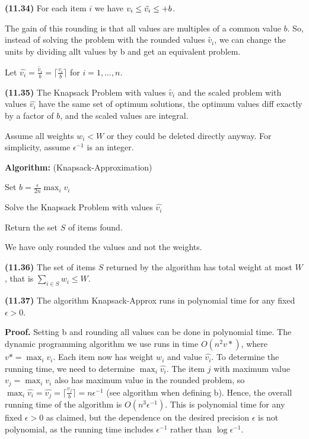 \documentclass{proc}
\begin{document}
\begin{mdframed}
    \textbf{(11.34)} For each item $i$ we have $v_i \le \tilde{v_i} \le \title{v_i} + b$.
\end{mdframed}

The gain of this rounding is that all values are multiples of a common value $b$. So, instead of solving the problem with the rounded values $\tilde{v_i}$, we can change the units by dividing allt values by b and get an equivalent problem.

\begin{mdframed}
    Let $\hat{v_i} = \frac{\tilde{v_i}}{b} = \lceil \frac{v_i}{b} \rceil$ for $i = 1, \ldots, n$.
\end{mdframed}

\begin{mdframed}
    \textbf{(11.35)} The Knapsack Problem with values $\tilde{v_i}$ and the scaled problem with values $\hat{v_i}$ have the same set of optimum solutions, the optimum values diff exactly by a factor of $b$, and the scaled values are integral.
\end{mdframed}

Assume all weights $w_i < W$ or they could be deleted directly anyway. For simplicity, assume $\epsilon^{-1}$ is an integer.

\begin{mdframed}
    \textbf{Algorithm:} (Knapsack-Approximation)

    Set $b = \frac{\epsilon}{2n} \max_i v_i$
    
    Solve the Knapsack Problem with values $\hat{v_i}$
    
    Return the set $S$ of items found.
\end{mdframed}

We have only rounded the values and not the weights.

\begin{mdframed}
    \textbf{(11.36)} The set of items $S$ returned by the algorithm has total weight at most $W$, that is $\sum_{i \in S} w_i \le W$.
\end{mdframed}

\begin{mdframed}
    \textbf{(11.37)} The algorithm Knapsack-Approx runs in polynomial time for any fixed $\epsilon > 0$.
    
    \textbf{Proof.} Setting b and rounding all values can be done in polynomial time. The dynamic programming algorithm we use runs in time $O(n^2 v*)$, where $v* = \max_i v_i$. Each item now has weight $w_i$ and value $\hat{v_i}$. To determine the running time, we need to determine $\max_i \hat{v_i}$. The item $j$ with maximum value $v_j = \max_i v_i$ also has maximum value in the rounded problem, so $\max_i \hat{v_i} = \hat{v_j} = \lceil \frac{v_j}{b} \rceil = n \epsilon^{-1}$ (see algorithm when defining b). Hence, the overall running time of the algorithm is $O(n^3 \epsilon^{-1})$. This is polynomial time for any fixed $\epsilon > 0$ as claimed, but the dependence on the desired precision $\epsilon$ is not polynomial, as the running time includes $\epsilon^{-1}$ rather than $\log \epsilon^{-1}$.
\end{mdframed}
\end{document}
